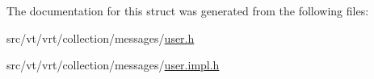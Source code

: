 The documentation for this struct was generated from the following files\+:\begin{DoxyCompactItemize}
\item 
src/vt/vrt/collection/messages/\hyperlink{user_8h}{user.\+h}\item 
src/vt/vrt/collection/messages/\hyperlink{user_8impl_8h}{user.\+impl.\+h}\end{DoxyCompactItemize}
